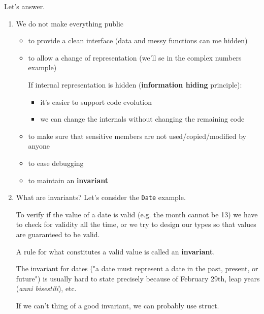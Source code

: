 \bigskip

Let's answer.
\begin{enumerate}[$\triangleright$]
    \item We do not make everything public
    \begin{itemize}
        \item to provide a clean interface (data and messy functions can me hidden)

        \item to allow a change of representation (we'll se in the complex numbers example)

        \begin{marker}
        If internal representation is hidden (\textbf{information hiding} principle):
        \begin{itemize}
            \item it's easier to support code evolution
            \item we can change the internals without changing the remaining code
        \end{itemize}
        \end{marker}

        \item to make sure that sensitive members are not used/copied/modified by anyone

        \item to ease debugging

        \item to maintain an \textbf{invariant}
    \end{itemize}

    \item What are invariants? Let's consider the \texttt{Date} example. 

    To verify if the value of a date is valid (e.g. the month cannot be 13) we have to check for validity all the time, or we try to design our types so that values are guaranteed to be valid.

    A rule for what constitutes a valid value is called an \textbf{invariant}.

    The invariant for dates ("a date must represent a date in the past, present, or future") is usually hard to state precisely because of February 29th, leap years (\emph{anni bisestili}), etc.

    \begin{marker}
    If we can't thing of a good invariant, we can probably use struct.
    \end{marker}


\end{enumerate}
